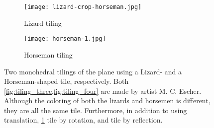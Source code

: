 
\begin{figure}
    \centering
    \begin{subfigure}{.47\textwidth}
        \centering
        \texttt{[image: lizard-crop-horseman.jpg]}
        \caption{Lizard tiling \cite{m.c.escherLizard1942}}
        \label{fig:tiling_three}
    \end{subfigure}\quad
    \begin{subfigure}{.47\textwidth}
        \centering
        \texttt{[image: horseman-1.jpg]}
        \caption{Horseman tiling \cite{m.c.escherHorseman1946}}
        \label{fig:tiling_four}
    \end{subfigure}
    \caption{Two monohedral tilings of the plane using a Lizard- and a Horseman-shaped tile, respectively. Both \cref{fig:tiling_three,fig:tiling_four} are made by artist M. C. Escher. Although the coloring of both the lizards and horsemen is different, they are all the same tile. Furthermore, in addition to using translation, \cref{fig:tiling_three} tile by rotation, and  tile by reflection.}
    \label{fig:tilings_three_four}
\end{figure}





